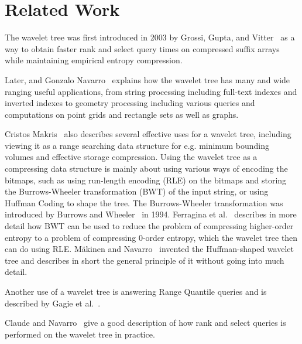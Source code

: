 \section{Related Work}
The wavelet tree was first introduced in 2003 by Grossi, Gupta, and Vitter~ as a way to obtain faster rank and select query times on compressed suffix arrays while maintaining empirical entropy compression.

Later, and Gonzalo Navarro~ explains how the wavelet tree has many and wide ranging useful applications, from string processing including full-text indexes and inverted indexes to geometry processing including various queries and computations on point grids and rectangle sets as well as graphs.

Cristos Makris~ also describes several effective uses for a wavelet tree, including viewing it as a range searching data structure for e.g. minimum bounding volumes and effective storage compression.
Using the wavelet tree as a compressing data structure is mainly about using various ways of encoding the bitmaps, such as using run-length encoding (RLE) on the bitmaps and storing the Burrows-Wheeler transformation (BWT) of the input string, or using Huffman Coding to shape the tree.
The Burrows-Wheeler transformation was introduced by Burrows and Wheeler~ in 1994.
Ferragina et al.~ describes in more detail how BWT can be used to reduce the problem of compressing higher-order entropy to a problem of compressing 0-order entropy, which the wavelet tree then can do using RLE.
Mäkinen and Navarro~ invented the Huffman-shaped wavelet tree and describes in short the general principle of it without going into much detail.

Another use of a wavelet tree is answering Range Quantile queries and is described by Gagie et al.~.



Claude and Navarro~ give a good description of how rank and select queries is performed on the wavelet tree in practice.
